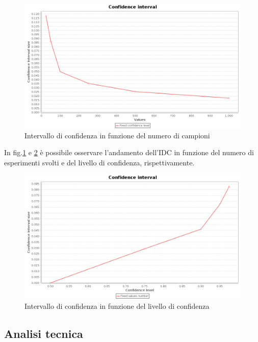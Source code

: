\begin{figure}[!h]{
	\begin{center}
	   \includegraphics[width=\textwidth]{figures/IDC_1.png}
	\end{center}}
	\caption{Intervallo di confidenza in funzione del numero di campioni}
	\label{fig:idc1}
\end{figure}

In fig.\ref{fig:idc1} e \ref{fig:idc2} \`e possibile osservare l'andamento dell'IDC in funzione del numero di esperimenti svolti e del livello di confidenza, rispettivamente.

\begin{figure}[!h]{
	\begin{center}
	   \includegraphics[width=\textwidth]{figures/IDC_2.png}
	\end{center}}
	\caption{Intervallo di confidenza in funzione del livello di confidenza}
	\label{fig:idc2}
\end{figure}

\subsection{Analisi tecnica}

